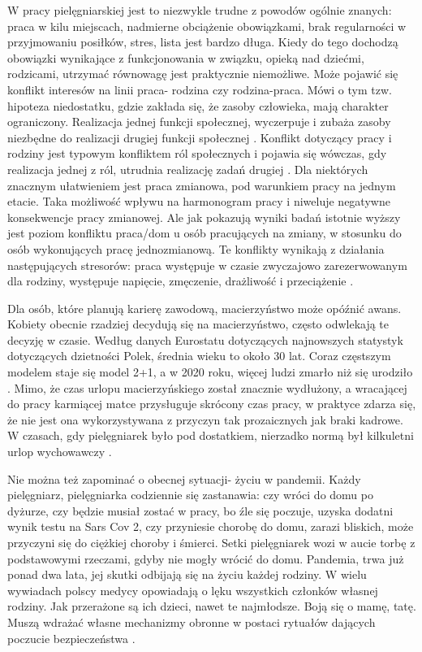 \documentclass[a4paper,12pt,twoside,openany]{report}
\begin{document}
W pracy pielęgniarskiej jest to niezwykle trudne z powodów ogólnie znanych: praca w kilu miejscach, nadmierne obciążenie obowiązkami, brak regularności w przyjmowaniu posiłków, stres, lista jest bardzo długa. Kiedy do tego dochodzą obowiązki wynikające z funkcjonowania w związku, opieką nad dziećmi, rodzicami, utrzymać równowagę jest praktycznie niemożliwe. Może pojawić się konflikt interesów na linii praca- rodzina czy rodzina-praca. Mówi o tym tzw. hipoteza niedostatku,  gdzie zakłada się, że zasoby człowieka, mają charakter ograniczony. Realizacja jednej funkcji społecznej, wyczerpuje i zubaża zasoby niezbędne do realizacji drugiej funkcji społecznej \cite{hipoteza}. Konflikt dotyczący pracy i rodziny jest typowym konfliktem ról społecznych i pojawia się wówczas, gdy realizacja jednej z ról, utrudnia realizację zadań drugiej \cite{relacja}. Dla niektórych znacznym ułatwieniem jest praca zmianowa, pod warunkiem pracy na jednym etacie. Taka możliwość wpływu na harmonogram pracy i niweluje negatywne konsekwencje pracy zmianowej. Ale jak pokazują wyniki badań  istotnie wyższy jest poziom konfliktu praca/dom u osób pracujących na zmiany, w stosunku do osób wykonujących pracę jednozmianową. Te konflikty wynikają z działania następujących stresorów: praca występuje w czasie zwyczajowo zarezerwowanym dla rodziny, występuje napięcie, zmęczenie, drażliwość i przeciążenie \cite{konflikt}.
  
Dla osób, które planują karierę zawodową, macierzyństwo może opóźnić awans. Kobiety obecnie rzadziej decydują się na macierzyństwo, często odwlekają te decyzję w czasie. Według danych Eurostatu dotyczących najnowszych statystyk dotyczących dzietności Polek, średnia wieku to około 30 lat. Coraz częstszym modelem staje się model 2+1, a w 2020 roku, więcej ludzi zmarło niż się urodziło \cite{dzieci}. Mimo, że czas urlopu macierzyńskiego został znacznie wydłużony, a wracającej do pracy karmiącej matce przysługuje skrócony czas pracy, w praktyce zdarza się, że nie jest ona wykorzystywana z przyczyn tak prozaicznych jak braki kadrowe. W czasach, gdy pielęgniarek było pod dostatkiem, nierzadko normą był kilkuletni urlop wychowawczy \cite{urlop}.

Nie można też zapominać o obecnej sytuacji- życiu w pandemii. Każdy pielęgniarz, pielęgniarka codziennie się zastanawia: czy wróci do domu po dyżurze, czy będzie musiał zostać w pracy, bo źle się poczuje, uzyska dodatni wynik testu na Sars Cov 2, czy przyniesie chorobę do domu, zarazi bliskich, może przyczyni się do ciężkiej choroby i śmierci. Setki pielęgniarek wozi w aucie torbę z podstawowymi rzeczami, gdyby nie mogły wrócić do domu. Pandemia, trwa już ponad dwa lata, jej skutki odbijają się na życiu każdej rodziny. W wielu wywiadach polscy medycy opowiadają o lęku wszystkich członków własnej rodziny. Jak przerażone są ich dzieci, nawet te najmłodsze. Boją się o mamę, tatę. Muszą wdrażać własne mechanizmy obronne w postaci rytuałów dających poczucie bezpieczeństwa  \cite{wywiad}.
\end{document}
